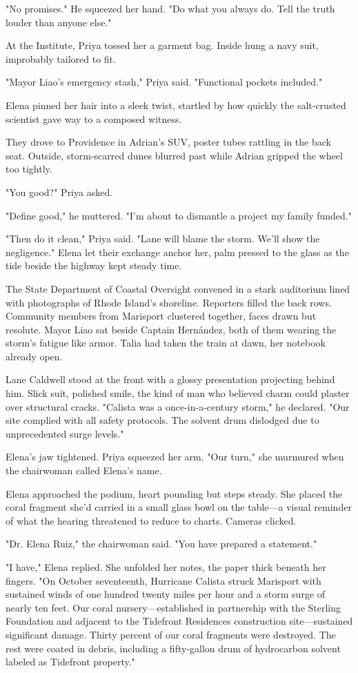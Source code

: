 "No promises." He squeezed her hand. "Do what you always do. Tell the truth louder than anyone else."

At the Institute, Priya tossed her a garment bag. Inside hung a navy suit, improbably tailored to fit.

"Mayor Liao's emergency stash," Priya said. "Functional pockets included."

Elena pinned her hair into a sleek twist, startled by how quickly the salt-crusted scientist gave way to a composed witness.

They drove to Providence in Adrian's SUV, poster tubes rattling in the back seat. Outside, storm-scarred dunes blurred past while Adrian gripped the wheel too tightly.

"You good?" Priya asked.

"Define good," he muttered. "I'm about to dismantle a project my family funded."

"Then do it clean," Priya said. "Lane will blame the storm. We'll show the negligence." Elena let their exchange anchor her, palm pressed to the glass as the tide beside the highway kept steady time.

The State Department of Coastal Oversight convened in a stark auditorium lined with photographs of Rhode Island's shoreline. Reporters filled the back rows. Community members from Marisport clustered together, faces drawn but resolute. Mayor Liao sat beside Captain Hernández, both of them wearing the storm's fatigue like armor. Talia had taken the train at dawn, her notebook already open.

Lane Caldwell stood at the front with a glossy presentation projecting behind him. Slick suit, polished smile, the kind of man who believed charm could plaster over structural cracks. "Calista was a once-in-a-century storm," he declared. "Our site complied with all safety protocols. The solvent drum dislodged due to unprecedented surge levels."

Elena's jaw tightened. Priya squeezed her arm. "Our turn," she murmured when the chairwoman called Elena's name.

Elena approached the podium, heart pounding but steps steady. She placed the coral fragment she'd carried in a small glass bowl on the table—a visual reminder of what the hearing threatened to reduce to charts. Cameras clicked.

"Dr. Elena Ruiz," the chairwoman said. "You have prepared a statement."

"I have," Elena replied. She unfolded her notes, the paper thick beneath her fingers. "On October seventeenth, Hurricane Calista struck Marisport with sustained winds of one hundred twenty miles per hour and a storm surge of nearly ten feet. Our coral nursery—established in partnership with the Sterling Foundation and adjacent to the Tidefront Residences construction site—sustained significant damage. Thirty percent of our coral fragments were destroyed. The rest were coated in debris, including a fifty-gallon drum of hydrocarbon solvent labeled as Tidefront property."

